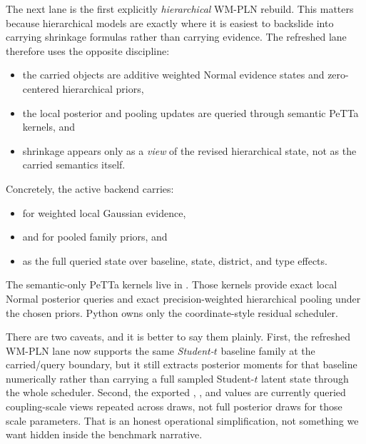 \documentclass[11pt,openany]{report}
\begin{document}
The next lane is the first explicitly \emph{hierarchical} WM-PLN rebuild.
This matters because hierarchical models are exactly where it is easiest to
backslide into carrying shrinkage formulas rather than carrying evidence.
The refreshed lane therefore uses the opposite discipline:
\begin{itemize}
\item the carried objects are additive weighted Normal evidence states and
zero-centered hierarchical priors,
\item the local posterior and pooling updates are queried through semantic
PeTTa kernels, and
\item shrinkage appears only as a \emph{view} of the revised hierarchical
state, not as the carried semantics itself.
\end{itemize}

Concretely, the active backend
 carries:
\begin{itemize}
\item {} for weighted local Gaussian evidence,
\item {} and  for pooled
family priors, and
\item {} as the full queried state over baseline,
state, district, and type effects.
\end{itemize}
The semantic-only PeTTa kernels live in
.  Those
kernels provide exact local Normal posterior queries and exact
precision-weighted hierarchical pooling under the chosen priors.  Python owns
only the coordinate-style residual scheduler.

There are two caveats, and it is better to say them plainly.
First, the refreshed WM-PLN lane now supports the same \emph{Student-$t$}
baseline family at the carried/query boundary, but it still extracts posterior
moments for that baseline numerically rather than carrying a full sampled
Student-$t$ latent state through the whole scheduler.  Second, the exported
, , and  values are
currently queried coupling-scale views repeated across draws, not full posterior
draws for those scale parameters.  That is an honest operational simplification,
not something we want hidden inside the benchmark narrative.
\end{document}
